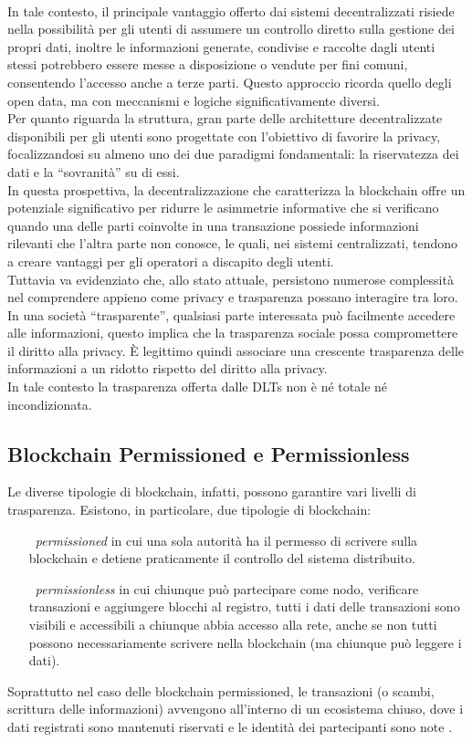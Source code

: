 \\In tale contesto, il principale vantaggio offerto dai sistemi decentralizzati risiede nella possibilità per gli utenti di assumere un controllo diretto sulla gestione dei propri dati, inoltre le informazioni generate, condivise e raccolte dagli utenti stessi potrebbero essere messe a disposizione o vendute per fini comuni,
consentendo l'accesso anche a terze parti. Questo approccio ricorda quello degli open data, ma con meccanismi e logiche significativamente diversi.
\\Per quanto riguarda la struttura, gran parte delle architetture decentralizzate disponibili per gli utenti sono progettate con l'obiettivo di favorire la privacy, focalizzandosi su almeno uno dei due paradigmi fondamentali: la riservatezza dei dati e la “sovranità” su di essi.
\\In questa prospettiva, la decentralizzazione che caratterizza la blockchain offre un potenziale significativo per ridurre le asimmetrie informative che si verificano quando una delle parti coinvolte in una transazione possiede informazioni rilevanti che l'altra parte non conosce, le quali, nei sistemi centralizzati, tendono a creare vantaggi per gli operatori a discapito degli utenti.
\\Tuttavia va evidenziato che, allo stato attuale, persistono numerose complessità nel comprendere appieno come privacy e trasparenza possano interagire tra loro.
\\In una società “trasparente”, qualsiasi parte interessata può facilmente accedere alle informazioni, questo implica che la trasparenza sociale possa compromettere il diritto alla privacy. \`E legittimo quindi associare una crescente trasparenza delle informazioni a un ridotto rispetto del diritto alla privacy.
\\In tale contesto la trasparenza offerta dalle DLTs non è né totale né incondizionata. 

\subsection{Blockchain Permissioned e Permissionless}
Le diverse tipologie di blockchain, infatti, possono garantire vari livelli di trasparenza. Esistono, in particolare, due tipologie di blockchain: 
\begin{itemize}
    \item[\textbullet\ \textit{permissioned}] in cui una sola autorità ha il permesso di scrivere sulla blockchain e detiene praticamente il controllo del sistema distribuito.
    \item[\textbullet\ \textit{permissionless}] in cui chiunque può partecipare come nodo, verificare transazioni e aggiungere blocchi al registro, tutti i dati delle transazioni sono visibili e accessibili a chiunque abbia accesso alla rete, anche se non tutti possono necessariamente scrivere nella blockchain (ma chiunque può leggere i dati).
\end{itemize}
Soprattutto nel caso delle blockchain permissioned, le transazioni (o scambi, scrittura delle informazioni) avvengono all’interno di un ecosistema chiuso, dove i dati registrati sono mantenuti riservati e le identità dei partecipanti sono note \cite{Blockchain_tecnologia_e_applicazioni_per_il_business}.
